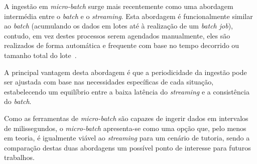 A ingestão em \textit{micro-batch} surge mais recentemente como uma abordagem intermédia entre o \textit{batch} e o \textit{streaming}.
Esta abordagem é funcionalmente similar ao \textit{batch} (acumulando os dados em lotes até à realização de um \textit{batch job}), contudo, em vez destes processos serem agendados manualmente, eles são realizados de forma automática e frequente com base no tempo decorrido ou tamanho total do lote~\cite{Dendane2019}.

A principal vantagem desta abordagem é que a periodicidade da ingestão pode ser ajustada com base nas necessidades específicas de cada situação, estabelecendo um equilíbrio entre a baixa latência do \textit{streaming} e a consistência do \textit{batch}.

Como as ferramentas de \textit{micro-batch} são capazes de ingerir dados em intervalos de milissegundos, o \textit{micro-batch} apresenta-se como uma opção que, pelo menos em teoria, é igualmente viável ao \textit{streaming} para um cenário de tutoria, sendo a comparação destas duas abordagens um possível ponto de interesse para futuros trabalhos.
